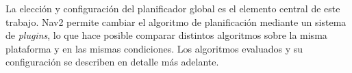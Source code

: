 La elección y configuración del planificador global es el elemento central de este trabajo. Nav2 permite cambiar el algoritmo de planificación mediante un sistema de \textit{plugins}, lo que hace posible comparar distintos algoritmos sobre la misma plataforma y en las mismas condiciones. Los algoritmos evaluados y su configuración se describen en detalle más adelante.
